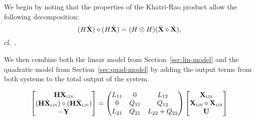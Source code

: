 We begin by noting that the properties of the Khatri-Rao product allow the following decomposition:
\begin{equation*}
    (H \dot{\mathbf{X}}) \diamond (H \dot{\mathbf{X}}) = (H \otimes H) (\dot{\mathbf{X}} \diamond \dot{\mathbf{X}}),
\end{equation*}
cf.~\cite[Equation~2.256]{Favier2021}.

We then combine both the linear model from Section~\ref{sec:lin-model} and the quadratic model from Section~\ref{sec:quad-model} by adding the output terms from both systems to the total output of the system.

\begin{equation*}
    \begin{bmatrix}
        \mathbf{H} \dot{\mathbf{X}}_{\textsc{lin}} \\
        (\mathbf{H} \dot{\mathbf{X}}_{\textsc{lin}}) \diamond (\mathbf{H} \dot{\mathbf{X}}_{\textsc{lin}}) \\
        - \mathbf{Y}
    \end{bmatrix} = \begin{pmatrix}
        L_{11} & 0 & L_{12} \\
        0 & Q_{11} & Q_{12} \\
        L_{21} & Q_{21} & L_{22} + Q_{22}
    \end{pmatrix}
    \begin{bmatrix}
        \mathbf{X}_{\textsc{lin}} \\
        \mathbf{X}_{\textsc{lin}} \diamond \mathbf{X}_{\textsc{lin}} \\
        \mathbf{U}
    \end{bmatrix}
\end{equation*}
